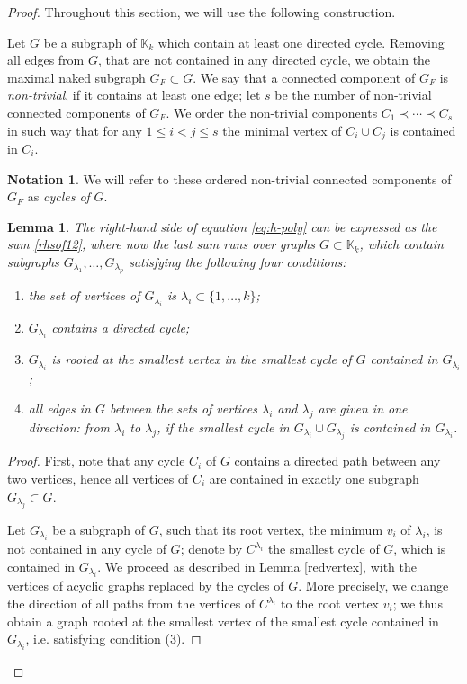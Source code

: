 \documentclass[11pt]{article}
\newtheorem{lemma}[theo]{Lemma}
\theoremstyle{definition}
\newtheorem{nota}[theo]{Notation}
\numberwithin{equation}{section}
\begin{document}
\begin{proof}
Throughout this section, we will use the following construction. 

\begin{constr}[cycles]\label{construction:cycle} Let $G$ be a subgraph of $\mathbb{K}_k$ which contain at least one directed cycle. Removing all edges from $G$, that are not contained in any directed cycle, we obtain the maximal naked subgraph $G_F\subset G$. We say that a connected component of $G_F$ is \textit{non-trivial}, if it contains at least one edge; let $s$ be the number of non-trivial connected components of $G_F$. We order the non-trivial components $C_1\prec \cdots \prec C_s$ in such way that for any $1\leq i<j \leq s$ the minimal vertex of $C_i \cup C_j$ is contained in $C_i$. 
\end{constr}

\begin{nota}
We will refer to these ordered non-trivial connected components of $G_F$ as  \textit{cycles of} $G$.
\end{nota}

\begin{lemma}\label{conditions}
The right-hand side of equation \eqref{eq:h-poly} can be expressed as the sum \eqref{rhsof12}, where now the last sum runs over graphs $G\subset \mathbb{K}_k$, which contain subgraphs $G_{\lambda_1}, \ldots ,G_{\lambda_p}$ satisfying the following four conditions: 
\begin{enumerate}
\item the set of vertices of $G_{\lambda_i}$ is $\lambda_i\subset\{1, \ldots ,k\}$;
\item $G_{\lambda_i}$ contains a directed cycle;
\item $G_{\lambda_i}$ is rooted at the smallest vertex  in the smallest cycle of $G$ contained in $ G_{\lambda_i}$;
\item all edges in $G$ between the sets of vertices $\lambda_i$ and $\lambda_j$ are given in one direction: from $\lambda_i$ to $\lambda_j$, if the smallest cycle in $G_{\lambda_i}\cup G_{\lambda_j}$ is contained in $G_{\lambda_i}$.
\end{enumerate} 
\end{lemma}
\begin{proof}
First, note that any cycle $C_i$ of $G$ contains a directed path between any two vertices, hence all vertices of $C_i$ are contained in exactly one subgraph $G_{\lambda_j}\subset G$. 
 
Let $G_{\lambda_i}$ be a subgraph of $G$, such that its root vertex, the 
minimum $v_i$ of $\lambda_i$, is not contained in any cycle of $G$; denote by 
$C^{\lambda_{i}}$ the smallest cycle of $G$, which is contained in 
$G_{\lambda_i}$. We proceed as described in Lemma \ref{redvertex}, with the 
vertices of acyclic graphs replaced by the cycles of $G$. 
More precisely, we change the direction of all paths from the vertices of 
$C^{\lambda_{i}}$ to the root vertex $v_i$; we thus obtain a graph rooted at 
the smallest vertex of the smallest cycle contained in $ G_{\lambda_i}$, i.e.  
satisfying condition (3).


\end{proof}
\end{proof}
\end{document}
